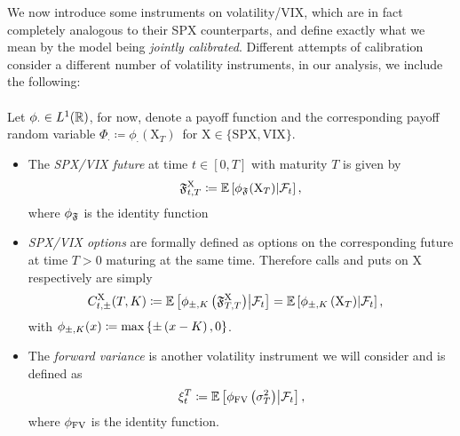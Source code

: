 We now introduce some instruments on volatility/VIX, which are in fact completely analogous to their SPX counterparts, and define exactly what we mean by the model being \textit{jointly calibrated}. Different attempts of calibration consider a different number of volatility instruments, in our analysis, we include the following:
~\\~\\
\indent Let $\phi_\cdot\in L^1(\mathbb{R})$, for now, denote a payoff function and the corresponding payoff random variable $\Phi_{\cdot}\coloneqq \phi_{\cdot}(\mathrm{X}_T)\,$ for $\mathrm{X}\in\{\text{SPX}, \text{VIX}\}$. 

\begin{itemize}
\item The \textit{SPX/VIX future} at time $t\in[0,T]$ with maturity $T$ is given by
\begin{equation*}
\mathfrak{F}_{t, T}^{\mathrm{X}}\coloneqq\mathbb{E}\left[\phi_{\mathfrak{F}}(\mathrm{X}_{T}) \middle\vert \mathcal{F}_{t}\right],
\end{equation*}
where $\phi_{\mathfrak{F}}$ is the identity function
\item \textit{SPX/VIX options} are formally defined as options on the corresponding future at time $T>0$ maturing at the same time. Therefore calls and puts on $\mathrm{X}$ respectively are simply
\begin{align*}
C_{t,\pm}^{\mathrm{X}}(T,K) &\coloneqq \mathbb{E}\left[\phi_{\pm, K}\left(\mathfrak{F}^{\mathrm{X}}_{T,T}\right) \middle\vert \mathcal{F}_{t}\right] = \mathbb{E}\left[\phi_{\pm, K}\left(\mathrm{X}_{T}\right)\middle\vert \mathcal{F}_{t}\right],
\end{align*}
with $\phi_{\pm, K}(x) \coloneqq \max \left\{ \pm \left(x - K\right), 0 \right\}$.
\item The \textit{forward variance} is another volatility instrument we will consider and is defined as
\begin{equation*}
\xi_{t}^{T} \coloneqq\mathbb{E}\left[\phi_\textup{FV}\left(\sigma^2_T\right) \middle\vert \mathcal{F}_{t}\right],
\end{equation*}
where $\phi_\textup{FV}$ is the identity function.
\end{itemize}

